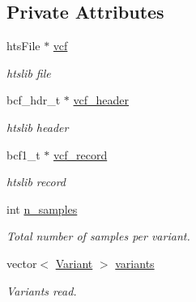 \subsection*{Private Attributes}
\begin{DoxyCompactItemize}
\item 
\mbox{\label{classVCF_ab423176408c3cdb799b69601603727c2}} 
hts\+File $\ast$ \mbox{\hyperlink{classVCF_ab423176408c3cdb799b69601603727c2}{vcf}}
\begin{DoxyCompactList}\small\item\em htslib file \end{DoxyCompactList}\item 
\mbox{\label{classVCF_a472294f6334be9a1473fc58ae9293cd3}} 
bcf\+\_\+hdr\+\_\+t $\ast$ \mbox{\hyperlink{classVCF_a472294f6334be9a1473fc58ae9293cd3}{vcf\+\_\+header}}
\begin{DoxyCompactList}\small\item\em htslib header \end{DoxyCompactList}\item 
\mbox{\label{classVCF_a5cdee19a6f9bc7b9f8f71e194d5132fa}} 
bcf1\+\_\+t $\ast$ \mbox{\hyperlink{classVCF_a5cdee19a6f9bc7b9f8f71e194d5132fa}{vcf\+\_\+record}}
\begin{DoxyCompactList}\small\item\em htslib record \end{DoxyCompactList}\item 
\mbox{\label{classVCF_a4b70c6a27fd6501f46d5e328592c0723}} 
int \mbox{\hyperlink{classVCF_a4b70c6a27fd6501f46d5e328592c0723}{n\+\_\+samples}}
\begin{DoxyCompactList}\small\item\em Total number of samples per variant. \end{DoxyCompactList}\item 
\mbox{\label{classVCF_a1cdc8b86ddf1e0f543470ea283bbae90}} 
vector$<$ \mbox{\hyperlink{classVariant}{Variant}} $>$ \mbox{\hyperlink{classVCF_a1cdc8b86ddf1e0f543470ea283bbae90}{variants}}
\begin{DoxyCompactList}\small\item\em Variants read. \end{DoxyCompactList}\item 

\end{DoxyCompactItemize}
